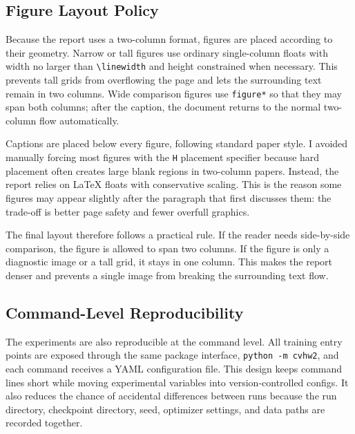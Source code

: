 \documentclass[10pt,twocolumn]{article}
\begin{document}
\subsection{Figure Layout Policy}

Because the report uses a two-column format, figures are placed according to their geometry. Narrow or tall figures use ordinary single-column floats with width no larger than \verb|\linewidth| and height constrained when necessary. This prevents tall grids from overflowing the page and lets the surrounding text remain in two columns. Wide comparison figures use \verb|figure*| so that they may span both columns; after the caption, the document returns to the normal two-column flow automatically.

Captions are placed below every figure, following standard paper style. I avoided manually forcing most figures with the \verb|H| placement specifier because hard placement often creates large blank regions in two-column papers. Instead, the report relies on LaTeX floats with conservative scaling. This is the reason some figures may appear slightly after the paragraph that first discusses them: the trade-off is better page safety and fewer overfull graphics.

The final layout therefore follows a practical rule. If the reader needs side-by-side comparison, the figure is allowed to span two columns. If the figure is only a diagnostic image or a tall grid, it stays in one column. This makes the report denser and prevents a single image from breaking the surrounding text flow.

\subsection{Command-Level Reproducibility}

The experiments are also reproducible at the command level. All training entry points are exposed through the same package interface, \verb|python -m cvhw2|, and each command receives a YAML configuration file. This design keeps command lines short while moving experimental variables into version-controlled configs. It also reduces the chance of accidental differences between runs because the run directory, checkpoint directory, seed, optimizer settings, and data paths are recorded together.
\end{document}
